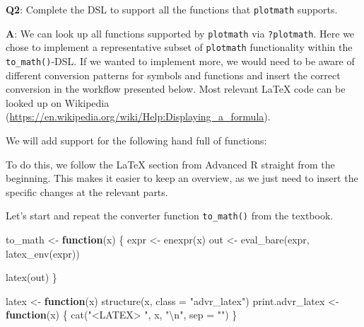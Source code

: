 \documentclass[
]{krantz}
\makeatletter
\newenvironment{Shaded}{\begin{snugshade}}{\end{snugshade}}
\newcommand{\CharTok}[1]{\textcolor[rgb]{0.31,0.60,0.02}{#1}}
\newcommand{\ControlFlowTok}[1]{\textcolor[rgb]{0.13,0.29,0.53}{\textbf{#1}}}
\newcommand{\DataTypeTok}[1]{\textcolor[rgb]{0.13,0.29,0.53}{#1}}
\newcommand{\KeywordTok}[1]{\textcolor[rgb]{0.13,0.29,0.53}{\textbf{#1}}}
\newcommand{\NormalTok}[1]{#1}
\newcommand{\OperatorTok}[1]{\textcolor[rgb]{0.81,0.36,0.00}{\textbf{#1}}}
\newcommand{\StringTok}[1]{\textcolor[rgb]{0.31,0.60,0.02}{#1}}
\renewcommand{\href}[2]{#2 (\url{#1})}
\newenvironment{kframe}{%
\medskip{}
\setlength{\fboxsep}{.8em}
 \def\at@end@of@kframe{}%
 \ifinner\ifhmode%
  \def\at@end@of@kframe{\end{minipage}}%
  \begin{minipage}{\columnwidth}%
 \fi\fi%
 \def\FrameCommand##1{\hskip\@totalleftmargin \hskip-\fboxsep
 \colorbox{shadecolor}{##1}\hskip-\fboxsep
     \hskip-\linewidth \hskip-\@totalleftmargin \hskip\columnwidth}%
 \MakeFramed {\advance\hsize-\width
   \@totalleftmargin\z@ \linewidth\hsize
   \@setminipage}}%
 {\par\unskip\endMakeFramed%
 \at@end@of@kframe}
\renewenvironment{Shaded}{\begin{kframe}}{\end{kframe}}
\renewcommand{\KeywordTok} [1]{\textcolor[rgb]{0.00,0.44,0.13}{{#1}}}
\renewcommand{\DataTypeTok}[1]{\textcolor[rgb]{0.56,0.13,0.00}{{#1}}}
\renewcommand{\CharTok}    [1]{\textcolor[rgb]{0.25,0.44,0.63}{{#1}}}
\renewcommand{\StringTok}  [1]{\textcolor[rgb]{0.25,0.44,0.63}{{#1}}}
\renewcommand{\NormalTok}  [1]{{#1}}
\makeatother
\begin{document}
\textbf{{Q2}}: Complete the DSL to support all the functions that \texttt{plotmath} supports.

\textbf{{A}}: We can look up all functions supported by \texttt{plotmath} via \texttt{?plotmath}. Here we chose to implement a representative subset of \texttt{plotmath} functionality within the \texttt{to\_math()}-DSL. If we wanted to implement more, we would need to be aware of different conversion patterns for symbols and functions and insert the correct conversion in the workflow presented below. Most relevant LaTeX code can be looked up on \href{https://en.wikipedia.org/wiki/Help:Displaying_a_formula}{Wikipedia}.

We will add support for the following hand full of functions:

\begin{Shaded}
\end{Shaded}

To do this, we follow the LaTeX section from Advanced R straight from the beginning. This makes it easier to keep an overview, as we just need to insert the specific changes at the relevant parts.

Let's start and repeat the converter function \texttt{to\_math()} from the textbook.

\begin{Shaded}
\begin{Highlighting}[]
\NormalTok{to_math <-}\StringTok{ }\ControlFlowTok{function}\NormalTok{(x) \{}
\NormalTok{  expr <-}\StringTok{ }\KeywordTok{enexpr}\NormalTok{(x)}
\NormalTok{  out <-}\StringTok{ }\KeywordTok{eval_bare}\NormalTok{(expr, }\KeywordTok{latex_env}\NormalTok{(expr))}
  
  \KeywordTok{latex}\NormalTok{(out)}
\NormalTok{\}}

\NormalTok{latex <-}\StringTok{ }\ControlFlowTok{function}\NormalTok{(x) }\KeywordTok{structure}\NormalTok{(x, }\DataTypeTok{class =} \StringTok{"advr_latex"}\NormalTok{)}
\NormalTok{print.advr_latex <-}\StringTok{ }\ControlFlowTok{function}\NormalTok{(x) \{}
  \KeywordTok{cat}\NormalTok{(}\StringTok{"<LATEX> "}\NormalTok{, x, }\StringTok{"}\CharTok{\textbackslash{}n}\StringTok{"}\NormalTok{, }\DataTypeTok{sep =} \StringTok{""}\NormalTok{)}
\NormalTok{\}}
\end{Highlighting}
\end{Shaded}
\end{document}
